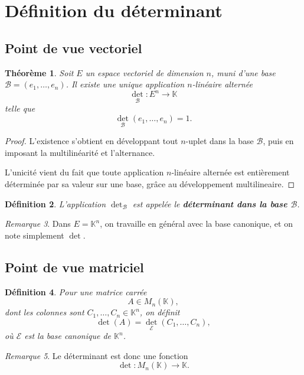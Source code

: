 \documentclass[11pt,a4paper]{article}
\newtheorem{definition}{Définition}[section]
\newtheorem{theoreme}[definition]{Théorème}
\theoremstyle{remark}
\newtheorem{remarque}[definition]{Remarque}
\newcommand{\K}{\mathbb{K}}
\begin{document}
\section{Définition du déterminant}

\subsection{Point de vue vectoriel}

\begin{theoreme}
Soit \(E\) un espace vectoriel de dimension \(n\), muni d’une base \(\mathcal B=(e_1,\dots,e_n)\).  
Il existe une unique application \(n\)-linéaire alternée
\[
\det_{\mathcal B}:E^n\to \K
\]
telle que
\[
\det_{\mathcal B}(e_1,\dots,e_n)=1.
\]
\end{theoreme}

\begin{proof}
L’existence s’obtient en développant tout \(n\)-uplet dans la base \(\mathcal B\), puis en imposant la multilinéarité et l’alternance.

L’unicité vient du fait que toute application \(n\)-linéaire alternée est entièrement déterminée par sa valeur sur une base, grâce au développement multilineaire.
\end{proof}

\begin{definition}
L’application \(\det_{\mathcal B}\) est appelée le \textbf{déterminant dans la base \(\mathcal B\)}.
\end{definition}

\begin{remarque}
Dans \(E=\K^n\), on travaille en général avec la base canonique, et on note simplement \(\det\).
\end{remarque}

\subsection{Point de vue matriciel}

\begin{definition}
Pour une matrice carrée
\[
A\in M_n(\K),
\]
dont les colonnes sont \(C_1,\dots,C_n\in\K^n\), on définit
\[
\det(A)=\det_{\mathcal E}(C_1,\dots,C_n),
\]
où \(\mathcal E\) est la base canonique de \(\K^n\).
\end{definition}

\begin{remarque}
Le déterminant est donc une fonction
\[
\det:M_n(\K)\to\K.
\]
\end{remarque}
\end{document}
